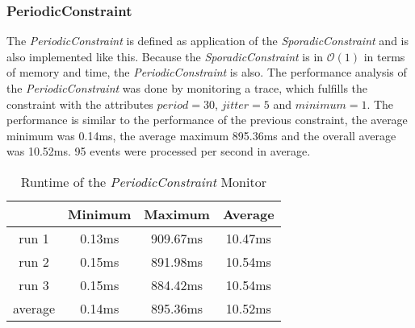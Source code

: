 \subsubsection{PeriodicConstraint}
	The \emph{PeriodicConstraint} is defined as application of the \emph{SporadicConstraint} and is also implemented like this. Because the \emph{SporadicConstraint} is in $\mathcal{O}(1)$ in terms of memory and time, the \emph{PeriodicConstraint} is also.
	The performance analysis of the \emph{PeriodicConstraint} was done by monitoring a trace, which fulfills the constraint with the attributes $period=30$, $jitter=5$ and $minimum=1$. The performance is similar to the performance of the previous constraint, the average minimum was 0.14ms, the average maximum 895.36ms and the overall average was 10.52ms. 95 events were processed per second in average.
	\begin{table}
		\begin{tabular}{|c|c|c|c|}
			\hline
					& Minimum & Maximum & Average \\
			\hline
			run 1	& 0.13ms & 909.67ms & 10.47ms \\
			\hline
			run 2	& 0.15ms & 891.98ms & 10.54ms\\
			\hline
			run 3	& 0.15ms & 884.42ms & 10.54ms\\
			\hline
			average & 0.14ms & 895.36ms & 10.52ms\\
			\hline
		\end{tabular}
		\centering
		\label{tab:runtimePeriodicConstraint}
		\caption{Runtime of the \emph{PeriodicConstraint} Monitor}
	\end{table}
	
